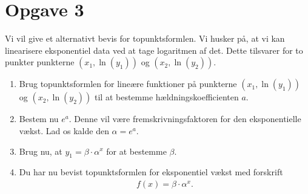 \section*{Opgave 3}
Vi vil give et alternativt bevis for topunktsformlen. Vi husker på, at vi kan linearisere eksponentiel data ved at tage logaritmen af det. Dette tilsvarer for to punkter punkterne $(x_1,\ln(y_1))$ og $(x_2,\ln(y_2))$.
\begin{enumerate}[label=\roman*)]
\item Brug topunktsformlen for lineære funktioner på punkterne $(x_1,\ln(y_1))$ og $(x_2,\ln(y_2))$ til at bestemme hældningskoefficienten $a$. 
\item Bestem nu $e^a$. Denne vil være fremskrivningsfaktoren for den eksponentielle vækst. Lad os kalde den $\alpha = e^a$.  
\item Brug nu, at $y_1 = \beta \cdot \alpha ^x$ for at bestemme $\beta$. 
\item Du har nu bevist topunktsformlen for eksponentiel vækst med forskrift
\begin{align*}
f(x) = \beta \cdot \alpha^x.
\end{align*}
\end{enumerate}